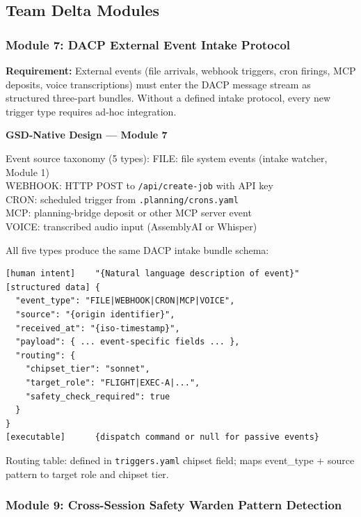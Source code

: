 \documentclass[11pt,letterpaper]{article}
\begin{document}
\subsection{Team Delta Modules}

\subsubsection{Module 7: DACP External Event Intake Protocol}

\textbf{Requirement:} External events (file arrivals, webhook triggers, cron firings, MCP deposits, voice transcriptions) must enter the DACP message stream as structured three-part bundles. Without a defined intake protocol, every new trigger type requires ad-hoc integration.

\begin{implbox}
\textbf{GSD-Native Design --- Module 7}

Event source taxonomy (5 types):
  FILE: file system events (intake watcher, Module 1)\\
  WEBHOOK: HTTP POST to \texttt{/api/create-job} with API key\\
  CRON: scheduled trigger from \texttt{.planning/crons.yaml}\\
  MCP: planning-bridge deposit or other MCP server event\\
  VOICE: transcribed audio input (AssemblyAI or Whisper)

All five types produce the same DACP intake bundle schema:
\begin{verbatim}
[human intent]    "{Natural language description of event}"
[structured data] {
  "event_type": "FILE|WEBHOOK|CRON|MCP|VOICE",
  "source": "{origin identifier}",
  "received_at": "{iso-timestamp}",
  "payload": { ... event-specific fields ... },
  "routing": {
    "chipset_tier": "sonnet",
    "target_role": "FLIGHT|EXEC-A|...",
    "safety_check_required": true
  }
}
[executable]      {dispatch command or null for passive events}
\end{verbatim}

Routing table: defined in \texttt{triggers.yaml} chipset field; maps event\_type + source pattern to target role and chipset tier.
\end{implbox}

\subsubsection{Module 9: Cross-Session Safety Warden Pattern Detection}
\end{document}
